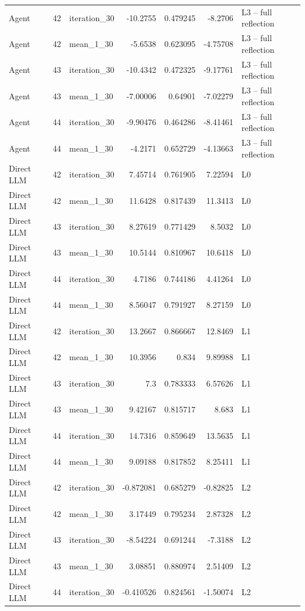 \begin{table}[htbp!]
\begin{tabular}{lrlrrrl}
Agent & 42 & iteration\_30 & -10.2755 & 0.479245 & -8.2706 & L3 -- full reflection \\
Agent & 42 & mean\_1\_30 & -5.6538 & 0.623095 & -4.75708 & L3 -- full reflection \\
Agent & 43 & iteration\_30 & -10.4342 & 0.472325 & -9.17761 & L3 -- full reflection \\
Agent & 43 & mean\_1\_30 & -7.00006 & 0.64901 & -7.02279 & L3 -- full reflection \\
Agent & 44 & iteration\_30 & -9.90476 & 0.464286 & -8.41461 & L3 -- full reflection \\
Agent & 44 & mean\_1\_30 & -4.2171 & 0.652729 & -4.13663 & L3 -- full reflection \\
Direct LLM & 42 & iteration\_30 & 7.45714 & 0.761905 & 7.22594 & L0 \\
Direct LLM & 42 & mean\_1\_30 & 11.6428 & 0.817439 & 11.3413 & L0 \\
Direct LLM & 43 & iteration\_30 & 8.27619 & 0.771429 & 8.5032 & L0 \\
Direct LLM & 43 & mean\_1\_30 & 10.5144 & 0.810967 & 10.6418 & L0 \\
Direct LLM & 44 & iteration\_30 & 4.7186 & 0.744186 & 4.41264 & L0 \\
Direct LLM & 44 & mean\_1\_30 & 8.56047 & 0.791927 & 8.27159 & L0 \\
Direct LLM & 42 & iteration\_30 & 13.2667 & 0.866667 & 12.8469 & L1 \\
Direct LLM & 42 & mean\_1\_30 & 10.3956 & 0.834 & 9.89988 & L1 \\
Direct LLM & 43 & iteration\_30 & 7.3 & 0.783333 & 6.57626 & L1 \\
Direct LLM & 43 & mean\_1\_30 & 9.42167 & 0.815717 & 8.683 & L1 \\
Direct LLM & 44 & iteration\_30 & 14.7316 & 0.859649 & 13.5635 & L1 \\
Direct LLM & 44 & mean\_1\_30 & 9.09188 & 0.817852 & 8.25411 & L1 \\
Direct LLM & 42 & iteration\_30 & -0.872081 & 0.685279 & -0.82825 & L2 \\
Direct LLM & 42 & mean\_1\_30 & 3.17449 & 0.795234 & 2.87328 & L2 \\
Direct LLM & 43 & iteration\_30 & -8.54224 & 0.691244 & -7.3188 & L2 \\
Direct LLM & 43 & mean\_1\_30 & 3.08851 & 0.880974 & 2.51409 & L2 \\
Direct LLM & 44 & iteration\_30 & -0.410526 & 0.824561 & -1.50074 & L2 \\

\end{tabular}
\end{table}
